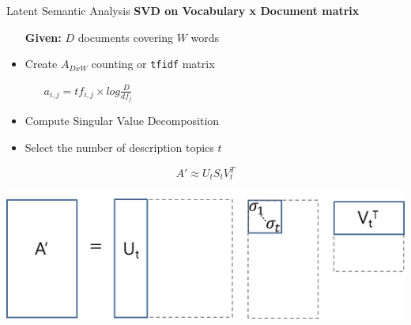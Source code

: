 \documentclass[10pt]{beamer}
\begin{document}
\begin{frame}{Latent Semantic Analysis}
  {\bf SVD on Vocabulary x Document matrix}

  \begin{itemize}
  \item[{\bf Given:}] $D$ documents covering $W$ words
  \item Create $A_{DxW}$ counting or \texttt{tfidf} matrix
    \begin{itemize}
    \item[] $a_{i,j} = tf_{i,j} \times log \frac{D}{df_j}$
    \end{itemize}
  \item Compute Singular Value Decomposition
  \item Select the number of description topics $t$
  \end{itemize}

  \begin{multicols}{2}
    \[A' \approx U_t S_t V_t^T\]
    \columnbreak

    \includegraphics[width=\columnwidth]{svd.png}
  \end{multicols}

\end{frame}
\end{document}
